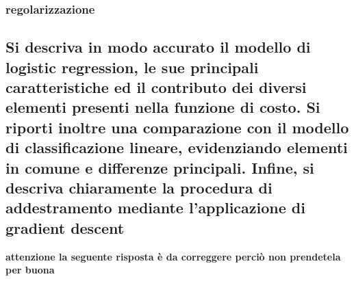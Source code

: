 \documentclass[10pt,oneside,a4paper]{article}
\begin{document}
\subsubsection{regolarizzazione}




\subsection{Si descriva in modo accurato il modello di logistic regression, le sue principali caratteristiche
	ed il contributo dei diversi elementi presenti nella funzione di costo. Si riporti inoltre
	una comparazione con il modello di classificazione lineare, evidenziando elementi in comune
	e differenze principali. Infine, si descriva chiaramente la procedura di addestramento
	mediante l’applicazione di gradient descent}

\textbf{attenzione la seguente risposta è da correggere perciò non prendetela per buona}
\end{document}
